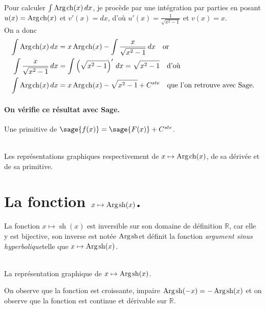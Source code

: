 \documentclass[a4paper,landscape,17pt]{extreport} %
\def\eclaire{\mathbb}
\def\R{\ensuremath{\eclaire R}}
\renewcommand{\sinh}{\mathop{\mathrm{sh}}}
\renewcommand{\cosh}{\mathop{\mathrm{ch}}}
\renewcommand{\arg}{\mathop{\mathrm{Arg}}}
\begin{document}
Pour calculer $\int \arg\mspace{-1mu}\cosh(x) \, dx$, je procède par une intégration par parties en posant $u(x) = \arg\mspace{-1mu}\cosh(x)$ et $v'(x) = dx$, d'où $u'(x) = \frac{1}{ \sqrt{x^2-1}}$ et $ v(x) = x $. \\
On a donc
\begin{align*}
\int \arg\mspace{-1mu}\cosh(x) \, dx & = x \arg\mspace{-1mu}\cosh(x) - \int \frac{x}{ \sqrt{x^2-1}} \, dx \quad \textrm{or}\\
\int \frac{x}{ \sqrt{x^2-1}} \, dx & = \int \left(\sqrt{x^2-1}\right)' \, dx = \sqrt{x^2-1}  \quad \textrm{d'où}\\
\int \arg\mspace{-1mu}\cosh(x) \, dx & = x \arg\mspace{-1mu}\cosh(x) - \sqrt{x^2-1} + C^{ste} \quad \textrm{que l'on retrouve avec Sage.}
\end{align*}


\paragraph{On vérifie ce résultat avec Sage.}

Une primitive de $\sage{f(x)} = \sage{F(x)} + C^{ste} $.

\begin{center}
\\
Les représentations graphiques respectivement de $x \mapsto \arg\mspace{-1mu}\cosh(x)$, de sa dérivée et de sa primitive.
\end{center}



\section{La fonction  $x \mapsto \arg\mspace{-1mu}\sinh(x)$.}

La fonction $x \mapsto \sinh(x)$ est inversible sur son domaine de définition $\R$, car elle y est bijective, son inverse est notée \og$ \arg\mspace{-1mu}\sinh $\fg et définit la fonction \og\emph{argument sinus hyperbolique}\fg telle que $x \mapsto \arg\mspace{-1mu}\sinh(x)$.


\begin{center}
 \\
La représentation graphique de $x \mapsto \arg\mspace{-1mu}\sinh(x)$.
\end{center}
On observe que la fonction est croissante, impaire $\arg\mspace{-1mu}\sinh(-x) = -\arg\mspace{-1mu}\sinh(x) $
et on observe que la fonction est continue et dérivable sur $\R$.                                                                                                             
\end{document}
